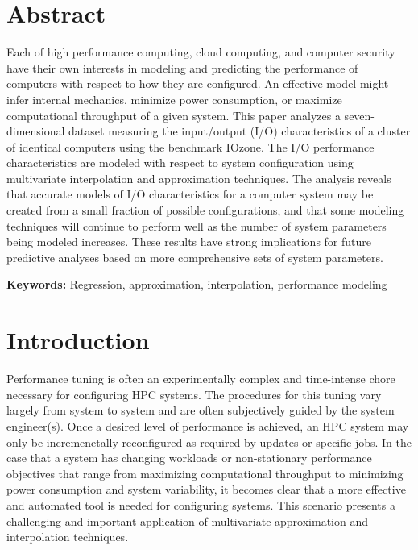 \documentclass{scspaperproc}
\theoremstyle{scsthe}
\begin{document}
\maketitle

\section*{Abstract}

Each of high performance computing, cloud computing, and computer
security have their own interests in modeling and predicting the
performance of computers with respect to how they are configured. An
effective model might infer internal mechanics, minimize power
consumption, or maximize computational throughput of a given
system. This paper analyzes a seven-dimensional dataset measuring the
input/output (I/O) characteristics of a cluster of identical computers
using the benchmark IOzone. The I/O performance characteristics are
modeled with respect to system configuration using multivariate
interpolation and approximation techniques. The analysis reveals that
accurate models of I/O characteristics for a computer system may be
created from a small fraction of possible configurations, and that
some modeling techniques will continue to perform well as the number
of system parameters being modeled increases. These results have
strong implications for future predictive analyses based on more
comprehensive sets of system parameters.

\textbf{Keywords:} Regression, approximation, interpolation,
performance modeling


\section{Introduction}

Performance tuning is often an experimentally complex and time-intense
chore necessary for configuring HPC systems. The procedures for this
tuning vary largely from system to system and are often subjectively
guided by the system engineer(s). Once a desired level of performance
is achieved, an HPC system may only be incremenetally reconfigured as
required by updates or specific jobs. In the case that a system has
changing workloads or non-stationary performance objectives that range
from maximizing computational throughput to minimizing power
consumption and system variability, it becomes clear that a more
effective and automated tool is needed for configuring systems. This
scenario presents a challenging and important application of
multivariate approximation and interpolation techniques.
\end{document}
